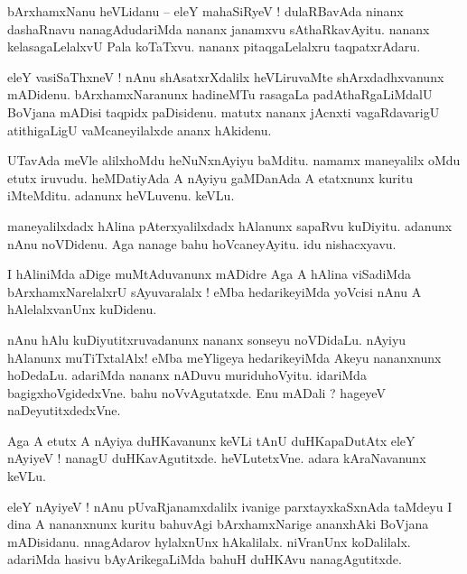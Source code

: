 \documentclass{article}
\begin{document}
\begin{mn}%
bArxhamxNanu heVLidanu -- eleY mahaSiRyeV ! dulaRBavAda ninanx dashaRnavu nanagAdudariMda nananx 
janamxvu sAthaRkavAyitu. nananx kelasagaLelalxvU Pala koTaTxvu. nananx pitaqgaLelalxru 
taqpatxrAdaru.
\end{mn}

\begin{mn}%
eleY vasiSaThxneV ! nAnu shAsatxrXdalilx heVLiruvaMte shArxdadhxvanunx mADidenu. bArxhamxNaranunx 
hadineMTu rasagaLa padAthaRgaLiMdalU BoVjana mADisi taqpidx paDisidenu. matutx nananx jAcnxti 
vagaRdavarigU atithigaLigU vaMcaneyilalxde ananx hAkidenu.
\end{mn}

\begin{mn}%
UTavAda meVle alilxhoMdu heNuNxnAyiyu baMditu. namamx maneyalilx oMdu etutx iruvudu. heMDatiyAda A 
nAyiyu gaMDanAda A etatxnunx kuritu iMteMditu. adanunx heVLuvenu. keVLu.
\end{mn}

\begin{mn}%
maneyalilxdadx hAlina pAterxyalilxdadx hAlanunx sapaRvu kuDiyitu. adanunx nAnu noVDidenu. Aga 
nanage bahu hoVcaneyAyitu. idu nishacxyavu.
\end{mn}

\begin{mn}%
I hAliniMda aDige muMtAduvanunx mADidre Aga A hAlina viSadiMda bArxhamxNarelalxrU sAyuvaralalx ! 
eMba hedarikeyiMda yoVcisi nAnu A hAlelalxvanUnx kuDidenu.
\end{mn}

\begin{mn}%
nAnu hAlu kuDiyutitxruvadanunx nananx sonseyu noVDidaLu. nAyiyu hAlanunx muTiTxtalAlx! eMba 
meYligeya hedarikeyiMda Akeyu nananxnunx hoDedaLu. adariMda nananx nADuvu muriduhoVyitu. idariMda 
bagigxhoVgidedxVne. bahu noVvAgutatxde. Enu mADali ? hageyeV naDeyutitxdedxVne.
\end{mn}

\begin{mn}%
Aga A etutx A nAyiya duHKavanunx keVLi tAnU duHKapaDutAtx eleY nAyiyeV ! nanagU duHKavAgutitxde. 
heVLutetxVne. adara kAraNavanunx keVLu.
\end{mn}

\begin{mn}%
eleY nAyiyeV ! nAnu pUvaRjanamxdalilx ivanige parxtayxkaSxnAda taMdeyu I dina A nananxnunx kuritu 
bahuvAgi bArxhamxNarige ananxhAki BoVjana mADisidanu. nnagAdarov hylalxnUnx hAkalilalx. niVranUnx 
koDalilalx. adariMda hasivu bAyArikegaLiMda bahuH duHKAvu nanagAgutitxde.
\end{mn}
\end{document}
